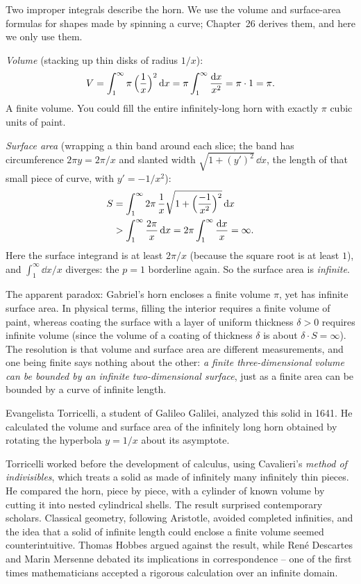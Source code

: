 Two improper integrals describe the horn. We use the volume and surface-area
formulas for shapes made by spinning a curve; Chapter~26 derives them, and here
we only use them.

\emph{Volume} (stacking up thin disks of radius $1/x$):
\[
  V = \int_1^{\infty} \pi\,\Bigl(\frac{1}{x}\Bigr)^2 \,\mathrm{d} x
    = \pi \int_1^{\infty}\frac{\mathrm{d} x}{x^2}
    = \pi \cdot 1 = \pi.
\]
A finite volume. You could fill the entire infinitely-long horn with exactly $\pi$
cubic units of paint.

\emph{Surface area} (wrapping a thin band around each slice; the band has
circumference $2\pi y = 2\pi/x$ and slanted width $\sqrt{1+(y')^2}\,\dd x$, the
length of that small piece of curve, with $y' = -1/x^2$):
\begin{align*}
  S &= \int_1^{\infty} 2\pi\,\frac{1}{x}\sqrt{1 + \Bigl(\frac{-1}{x^2}\Bigr)^2}\,\mathrm{d} x\\
    &> \int_1^{\infty} \frac{2\pi}{x}\,\mathrm{d} x = 2\pi \int_1^{\infty}\frac{\mathrm{d} x}{x}
    = \infty.
\end{align*}
Here the surface integrand is at least $2\pi/x$ (because the square root is at
least $1$), and $\int_1^\infty \dd x/x$ diverges: the $p=1$ borderline again. So the surface area is \emph{infinite}.

\begin{aestheticbox}
The apparent paradox: Gabriel's horn encloses a finite volume $\pi$, yet has
infinite surface area. In physical terms,
filling the interior requires a finite volume of paint, whereas coating the surface
with a layer of uniform thickness $\delta > 0$ requires infinite volume (since the volume
of a coating of thickness $\delta$ is about $\delta \cdot S = \infty$). The resolution
is that volume and surface area are different measurements, and one being finite
says nothing about the other:
\emph{a finite three-dimensional volume can be bounded by an infinite two-dimensional surface},
just as a finite area can be bounded by a curve of infinite length.
\end{aestheticbox}

\begin{historybox}
Evangelista Torricelli, a student of Galileo Galilei, analyzed this solid in 1641.
He calculated the volume and surface area of the infinitely long horn obtained by
rotating the hyperbola $y=1/x$ about its asymptote.

Torricelli worked before the development of calculus, using Cavalieri's \emph{method
of indivisibles}, which treats a solid as made of infinitely many infinitely thin
pieces. He compared the horn, piece by piece, with a cylinder of known volume
by cutting it into nested cylindrical shells.
The result surprised contemporary scholars. Classical geometry, following Aristotle,
avoided completed infinities, and the idea that a solid of infinite length could enclose
a finite volume seemed counterintuitive. Thomas Hobbes argued against the result, while
Ren\'e Descartes and Marin Mersenne debated its implications in correspondence --
one of the first times mathematicians accepted a rigorous calculation over an
infinite domain.
\end{historybox}

